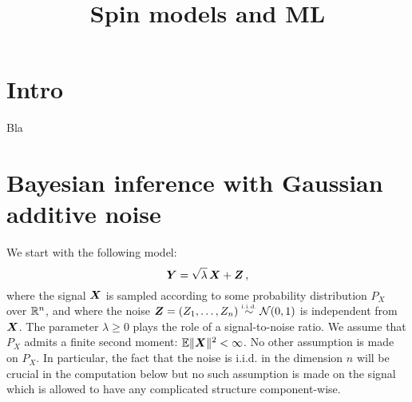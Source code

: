\documentclass[12pt,nocut]{article}
\title{Spin models and ML}
\date{}
\begin{document}
\maketitle{}

\section{Intro}
Bla

\section{Bayesian inference with Gaussian additive noise}\label{sec:i_mmse}

We start with the following model:
\begin{equation}\label{eq:inference}
	{\boldsymbol Y} = \sqrt{\lambda} \, {\boldsymbol X} + {\boldsymbol Z} \,,
\end{equation}
where the signal ${\boldsymbol X}$ is sampled according to some probability distribution $P_X$ over $\mathbb{R}^n$, and where the noise ${\boldsymbol Z} =(Z_1, \dots, Z_n) \overset{\text{\tiny i.i.d.}}{\sim} \mathcal{N}(0,1)$ is independent from ${\boldsymbol X}$. 
The parameter $\lambda \geq 0$ plays the role of a signal-to-noise ratio.
We assume that $P_X$ admits a finite second moment: $\mathbb{E} \|{\boldsymbol X}\|^2 < \infty$. No other assumption is made on $P_X$. In particular, the fact that the noise is i.i.d. in the dimension $n$ will be crucial in the computation below but no such assumption is made on the signal which is allowed to have any complicated structure component-wise.
\end{document}
